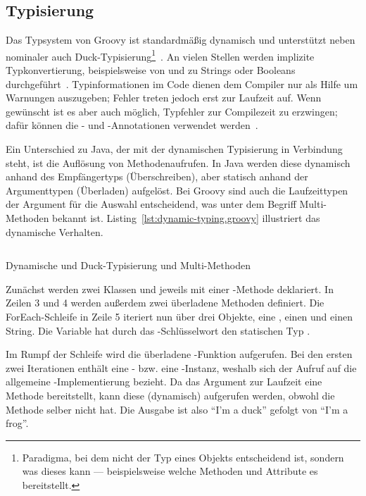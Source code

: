 \documentclass[a4paper]{article}
\newcommand{\outquote}[1]{``{#1}''}
\newcommand{\codelisting}[3]{\begin{listing}[htp]
	\inputminted{#1}{#1/#2}
	\vspace{-3ex}
	\caption{#3}
	\label{lst:#2}
\end{listing}}
\begin{document}
\subsection{Typisierung}\label{subsec:typisierung}

Das Typsystem von Groovy ist standardmäßig dynamisch und unterstützt neben nominaler auch Duck-Typisierung\footnote{Paradigma, bei dem nicht der Typ eines Objekts entscheidend ist, sondern was dieses kann --- beispielsweise welche Methoden und Attribute es bereitstellt.}~\cite[Abs.~1.6.6.]{groovy-lang:documentation}.
An vielen Stellen werden implizite Typkonvertierung, beispielsweise von und zu Strings oder Booleans durchgeführt~\cite[Abs.~1.6.3.]{groovy-lang:documentation}.
Typinformationen im Code dienen dem Compiler nur als Hilfe um Warnungen auszugeben; Fehler treten jedoch erst zur Laufzeit auf.
Wenn gewünscht ist es aber auch möglich, Typfehler zur Compilezeit zu erzwingen; dafür können die - und -Annotationen verwendet werden~\cite[Abs.~1.6.6.]{groovy-lang:documentation}.

Ein Unterschied zu Java, der mit der dynamischen Typisierung in Verbindung steht, ist die Auflösung von Methodenaufrufen.
In Java werden diese dynamisch anhand des Empfängertyps (Überschreiben), aber statisch anhand der Argumenttypen (Überladen) aufgelöst.
Bei Groovy sind auch die Laufzeittypen der Argument für die Auswahl entscheidend, was unter dem Begriff Multi-Methoden bekannt ist.
Listing~\ref{lst:dynamic-typing.groovy} illustriert das dynamische Verhalten.

\codelisting{groovy}{dynamic-typing.groovy}{Dynamische und Duck-Typisierung und Multi-Methoden}

Zunächst werden zwei Klassen  und  jeweils mit einer -Methode deklariert.
In Zeilen 3 und 4 werden außerdem zwei überladene Methoden  definiert.
Die ForEach-Schleife in Zeile 5 iteriert nun über drei Objekte, eine , einen  und einen String.
Die Variable  hat durch das -Schlüsselwort den statischen Typ .

Im Rumpf der Schleife wird die überladene -Funktion aufgerufen.
Bei den ersten zwei Iterationen enthält  eine - bzw. eine -Instanz, weshalb sich der Aufruf auf die allgemeine -Implementierung bezieht.
Da das Argument zur Laufzeit eine Methode  bereitstellt, kann diese (dynamisch) aufgerufen werden, obwohl  die Methode selber nicht hat.
Die Ausgabe ist also \outquote{I'm a duck} gefolgt von \outquote{I'm a frog}.
\end{document}

